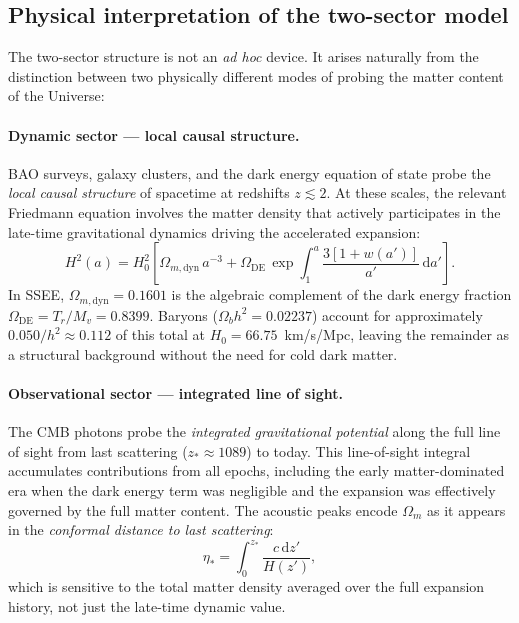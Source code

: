 \documentclass[12pt,a4paper]{article}
\begin{document}
\subsection{Physical interpretation of the two-sector model}
\label{sec:two_sector_physics}

The two-sector structure is not an \textit{ad hoc} device.
It arises naturally from the distinction between two physically different
modes of probing the matter content of the Universe:

\paragraph{Dynamic sector — local causal structure.}
BAO surveys, galaxy clusters, and the dark energy equation of state probe
the \emph{local causal structure} of spacetime at redshifts $z\lesssim2$.
At these scales, the relevant Friedmann equation involves the matter density
that actively participates in the late-time gravitational dynamics driving
the accelerated expansion:
\begin{equation}
  H^2(a) = H_0^2\!\left[\Omega_{m,\mathrm{dyn}}\,a^{-3}
  + \Omega_\mathrm{DE}\,\exp\!\!\int_1^a
  \frac{3[1+w(a')]}{a'}\,\mathrm{d}a'\right].
\end{equation}
In SSEE, $\Omega_{m,\mathrm{dyn}}=0.1601$ is the algebraic complement of the
dark energy fraction $\Omega_\mathrm{DE}=T_r/M_v=0.8399$.
Baryons ($\Omega_b h^2=0.02237$) account for approximately $0.050/h^2\approx0.112$
of this total at $H_0=66.75$~km/s/Mpc, leaving the remainder as a structural
background without the need for cold dark matter.

\paragraph{Observational sector — integrated line of sight.}
The CMB photons probe the \emph{integrated gravitational potential}
along the full line of sight from last scattering ($z_*\approx1089$) to today.
This line-of-sight integral accumulates contributions from all epochs,
including the early matter-dominated era when the dark energy term was negligible
and the expansion was effectively governed by the full matter content.
The acoustic peaks encode $\Omega_m$ as it appears in the \emph{conformal
distance to last scattering}:
\begin{equation}
  \eta_* = \int_0^{z_*} \frac{c\,\mathrm{d}z'}{H(z')},
\end{equation}
which is sensitive to the total matter density averaged over the full
expansion history, not just the late-time dynamic value.
\end{document}
